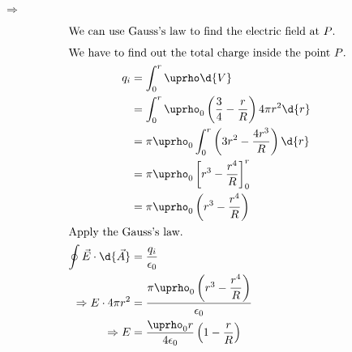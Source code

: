 \begin{solution}
	$\Rightarrow$
	\begin{center}
	\end{center}
		\begin{align*}
			\intertext{We can use Gauss's law to find the electric field at $P$.}
			\intertext{We have to find out the total charge inside the point $P$.}
			q_i &= \int_{0}^{r} \uprho \d{V}\\
			 	&= \int_0^r \uprho_0 \left(\dfrac{3}{4}-\dfrac{r}{R}\right)4\pi r^2 \d{r}\\
				&= \pi\uprho_0\int_{0}^{r} \left(3r^2 - \dfrac{4r^3}{R} \right) \d{r}\\
				&= \pi\uprho_0\left[r^3 - \dfrac{r^4}{R}\right]_0^r\\
				&= \pi\uprho_0\left(r^3 - \dfrac{r^4}{R}\right)\\
			\intertext{Apply the Gauss's law.}
			\oint \vec{E}\cdot\d{\vec{A}} &= \dfrac{q_i}{\epsilon_0}\\
			\Rightarrow E\cdot 4\pi r^2 &= \dfrac{\pi\uprho_0\left(r^3 - \dfrac{r^4}{R}\right)}{\epsilon_0}\\
			\Rightarrow E &= \dfrac{\uprho_0 r}{4\epsilon_0}\left(1-\dfrac{r}{R}\right)
		\end{align*}
	\end{solution}